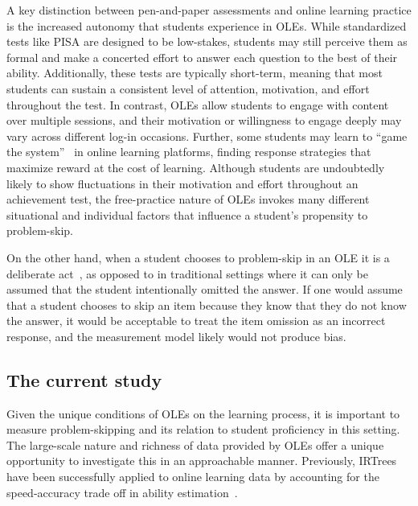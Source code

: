 \documentclass[anonymous,manuscript,review]{acmart}
\begin{document}
A key distinction between pen-and-paper assessments and online learning practice is the increased autonomy that students experience in OLEs. While standardized tests like PISA are designed to be low-stakes, students may still perceive them as formal and make a concerted effort to answer each question to the best of their ability. Additionally, these tests are typically short-term, meaning that most students can sustain a consistent level of attention, motivation, and effort throughout the test. In contrast, OLEs allow students to engage with content over multiple sessions, and their motivation or willingness to engage deeply may vary across different log-in occasions. Further, some students may learn to ``game the system''~\cite{baker2004off} in online learning platforms, finding response strategies that maximize reward at the cost of learning. Although students are undoubtedly likely to show fluctuations in their motivation and effort throughout an achievement test, the free-practice nature of OLEs invokes many different situational and individual factors that influence a student's propensity to problem-skip. 

On the other hand, when a student chooses to problem-skip in an OLE it is a deliberate act~\cite{savi2018delaying, savi2023combating}, as opposed to in traditional settings where it can only be assumed that the student intentionally omitted the answer. If one would assume that a student chooses to skip an item because they know that they do not know the answer, it would be acceptable to treat the item omission as an incorrect response, and the measurement model likely would not produce bias. 


\subsection{The current study}
Given the unique conditions of OLEs on the learning process, it is important to measure problem-skipping and its relation to student proficiency in this setting. The large-scale nature and richness of data provided by OLEs offer a unique opportunity to investigate this in an approachable manner. Previously, IRTrees have been successfully applied to online learning data by accounting for the speed-accuracy trade off in ability estimation~\cite{coomans2016distinguishing}. 
\end{document}
